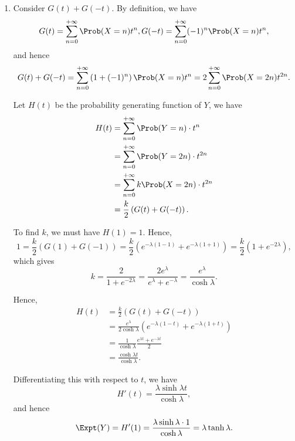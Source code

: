 \begin{enumerate}
    \item Consider \(G(t) + G(-t)\). By definition, we have
          \[
              G(t) = \sum_{n = 0}^{+\infty} \Prob(X = n) t^n, G(-t) = \sum_{n = 0}^{+\infty} (-1)^n \Prob(X = n) t^n,
          \]
          and hence
          \[
              G(t) + G(-t) = \sum_{n = 0}^{+\infty} \left(1 + (-1)^n\right) \Prob(X = n) t^n = 2 \sum_{n = 0}^{+\infty} \Prob(X = 2n) t^{2n}.
          \]

          Let \(H(t)\) be the probability generating function of \(Y\), we have
          \begin{align*}
              H(t) & = \sum_{n = 0}^{+\infty} \Prob(Y = n) \cdot t^n       \\
                   & = \sum_{n = 0}^{+\infty} \Prob(Y = 2n) \cdot t^{2n}   \\
                   & = \sum_{n = 0}^{+\infty} k \Prob(X = 2n) \cdot t^{2n} \\
                   & = \frac{k}{2} \left(G(t) + G(-t)\right).
          \end{align*}

          To find \(k\), we must have \(H(1) = 1\). Hence,
          \[
              1 = \frac{k}{2} \left(G(1) + G(-1)\right) = \frac{k}{2} \left(e^{- \lambda (1 - 1)} + e^{- \lambda (1 + 1)}\right) = \frac{k}{2} \left(1 + e^{-2 \lambda}\right),
          \]
          which gives
          \[
              k = \frac{2}{1 + e^{-2\lambda}} = \frac{2 e^{\lambda}}{e^{\lambda} + e^{-\lambda}} = \frac{e^{\lambda}}{\cosh \lambda}.
          \]

          Hence,
          \begin{align*}
              H(t) & = \frac{k}{2} \left(G(t) + G(-t)\right)                                                       \\
                   & = \frac{e^{\lambda}}{2 \cosh \lambda} \left(e^{-\lambda(1 - t)}  + e^{-\lambda(1 + t)}\right) \\
                   & = \frac{1}{\cosh \lambda} \frac{e^{\lambda t} + e^{-\lambda t}}{2}                            \\
                   & = \frac{\cosh \lambda t}{\cosh \lambda}.
          \end{align*}

          Differentiating this with respect to \(t\), we have
          \[
              H'(t) = \frac{\lambda \sinh \lambda t}{\cosh \lambda},
          \]
          and hence
          \[
              \Expt(Y) = H'(1) = \frac{\lambda \sinh \lambda \cdot 1}{\cosh \lambda} = \lambda \tanh \lambda.
          \]


\end{enumerate}

